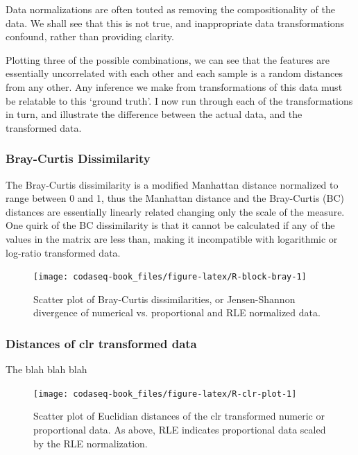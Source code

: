 \documentclass[
  onecolumn]{article}
\begin{document}
Data normalizations are often touted as removing the compositionality of the data. We shall see that this is not true, and inappropriate data transformations confound, rather than providing clarity.

Plotting three of the possible combinations, we can see that the features are essentially uncorrelated with each other and each sample is a random distances from any other. Any inference we make from transformations of this data must be relatable to this `ground truth'. I now run through each of the transformations in turn, and illustrate the difference between the actual data, and the transformed data.

\hypertarget{bray-curtis-dissimilarity}{%
\subsubsection{Bray-Curtis Dissimilarity}\label{bray-curtis-dissimilarity}}

The Bray-Curtis dissimilarity is a modified Manhattan distance normalized to range between 0 and 1, thus the Manhattan distance and the Bray-Curtis (BC) distances are essentially linearly related changing only the scale of the measure. One quirk of the BC dissimilarity is that it cannot be calculated if any of the values in the matrix are less than, making it incompatible with logarithmic or log-ratio transformed data.

\begin{figure}

{\centering \texttt{[image: codaseq-book\_files/figure-latex/R-block-bray-1]} 

}

\caption{Scatter plot of Bray-Curtis dissimilarities, or Jensen-Shannon divergence  of numerical vs. proportional and RLE normalized data.}\label{fig:R-block-bray}
\end{figure}

\hypertarget{distances-of-clr-transformed-data}{%
\subsubsection{Distances of clr transformed data}\label{distances-of-clr-transformed-data}}

The blah blah blah

\begin{figure}

{\centering \texttt{[image: codaseq-book\_files/figure-latex/R-clr-plot-1]} 

}

\caption{Scatter plot of Euclidian distances of the clr transformed numeric or proportional data. As above, RLE indicates proportional data scaled by the RLE normalization.}\label{fig:R-clr-plot}
\end{figure}
\end{document}
